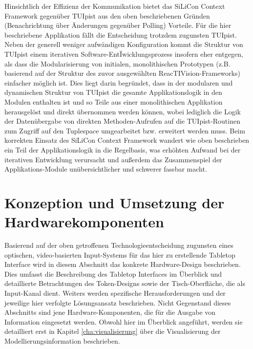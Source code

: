 Hinsichtlich der Effizienz der Kommunikation bietet das SiLiCon Context Framework gegenüber TUIpist aus den oben beschriebenen Gründen (Benachrichtung über Änderungen gegenüber Polling) Vorteile. Für die hier beschriebene Applikation fällt die Entscheidung trotzdem zugunsten TUIpist. Neben der generell weniger aufwändigen Konfiguration kommt die Struktur von TUIpist einem iterativen Software-Ent\-Ïwicklungsprozess insofern eher entgegen, als dass die Modularisierung von initialen, monolithischen Prototypen (z.B. basierend auf der Struktur des zuvor ausgewählten ReacTIVision-Frameworks) einfacher möglich ist. Dies liegt darin begründet, dass in der modularen und dynamischen Struktur von TUIpist die gesamte Applikationslogik in den Modulen enthalten ist und so Teile aus einer monolithischen Applikation herausgelöst und direkt übernommen werden können, wobei lediglich die Logik der Datenübergabe von direkten Methoden-Aufrufen auf die TUIpist-Routinen zum Zugriff auf den Tuplespace umgearbeitet bzw. erweitert werden muss. Beim korrekten Einsatz des SiLiCon Context Framework wandert wie oben beschrieben ein Teil der Applikationslogik in die Regelbasis, was erhöhten Aufwand bei der iterativen Entwicklung verursacht und außerdem das Zusammenspiel der Applikations-Module unübersichtlicher und schwerer fassbar macht.



\section{Konzeption und Umsetzung der Hardwarekomponenten} %
\label{sec:konzeption_und_umsetzung_der_hardwarekomponenten}

Basierend auf der oben getroffenen Technologieentscheidung zugunsten eines optischen, video-basierten Input-Systems für das hier zu erstellende Tabletop Interface wird in diesem Abschnitt das konkrete Hardware-Design beschrieben. Dies umfasst die Beschreibung des Tabletop Interfaces im Überblick und detaillierte Betrachtungen des Token-Designs sowie der Tisch-Oberfläche, die als Input-Kanal dient. Weiters werden spezifische Herausforderungen und der jeweilige hier verfolgte Lösungsansatz beschrieben. Nicht Gegenstand dieses Abschnitts sind jene Hardware-Komponenten, die für die Ausgabe von Information eingesetzt werden. Obwohl hier im Überblick angeführt, werden sie detailliert erst in Kapitel \ref{cha:visualisierung} über die Visualisierung der Modellierungsinformation beschrieben.

